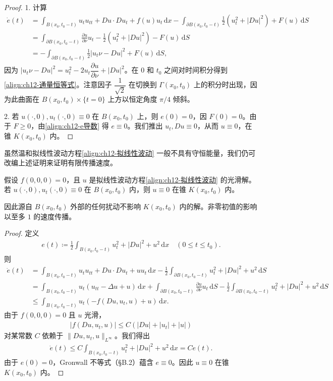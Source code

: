 \documentclass[../../main.tex]{subfiles}
\begin{document}
\begin{proof}
1. 计算
\begin{align}
\dot{e}(t)&=\int_{B(x_0,t_0-t)}u_tu_{tt}+Du\cdot Du_t+f(u)u_t\,\mathrm{d}x-\int_{\partial B(x_0,t_0-t)}\frac{1}{2}(u_t^2+|Du|^2)+F(u)\,\mathrm{d}S\nonumber\\
&=\int_{\partial B(x_0,t_0-t)}\frac{\partial u}{\partial\nu}u_t-\frac{1}{2}(u_t^2+|Du|^2)-F(u)\,\mathrm{d}S\nonumber\\
&=-\int_{\partial B(x_0,t_0-t)}\frac{1}{2}|u_t\nu-Du|^2+F(u)\,\mathrm{d}S,
\label{align:ch12-e导数}
\end{align}
因为 $|u_t\nu-Du|^2=u_t^2-2u_t\dfrac{\partial u}{\partial\nu}+|Du|^2$。在 $0$ 和 $t_0$ 之间对时间积分得到\eqref{align:ch12-通量恒等式}。注意因子 $\dfrac{1}{\sqrt{2}}$ 在切换到 $\Gamma(x_0,t_0)$ 上的积分时出现，因为此曲面在 $B(x_0,t_0)\times\{t=0\}$ 上方以恒定角度 $\pi/4$ 倾斜。

2. 若 $u(\cdot,0),u_t(\cdot,0)\equiv 0$ 在 $B(x_0,t_0)$ 上，则 $e(0)=0$，因 $F(0)=0$。由于 $F\geqslant 0$，由\eqref{align:ch12-e导数} 得 $e\equiv 0$。我们推出 $u_t,Du\equiv 0$，从而 $u\equiv 0$，在锥 $K(x_0,t_0)$ 内。
\end{proof}

虽然温和拟线性波动方程\eqref{align:ch12-拟线性波动} 一般不具有守恒能量，我们仍可改编上述证明来证明有限传播速度。

\begin{theorem}[依赖域。]\label{theorem:ch12-依赖域}假设 $f(0,0,0)=0$，且 $u$ 是拟线性波动方程\eqref{align:ch12-拟线性波动} 的光滑解。若 $u(\cdot,0),u_t(\cdot,0)\equiv 0$ 在 $B(x_0,t_0)$ 内，则 $u\equiv 0$ 在锥 $K(x_0,t_0)$ 内。

因此源自 $B(x_0,t_0)$ 外部的任何扰动不影响 $K(x_0,t_0)$ 内的解。非零初值的影响以至多 $1$ 的速度传播。
\end{theorem}

\begin{proof}
定义
\begin{align*}
e(t)\coloneqq\frac{1}{2}\int_{B(x_0,t_0-t)}u_t^2+|Du|^2+u^2\,\mathrm{d}x \quad (0\leqslant t\leqslant t_0).
\end{align*}
则
\begin{align*}
\dot{e}(t)&=\int_{B(x_0,t_0-t)}u_tu_{tt}+Du\cdot Du_t+uu_t\,\mathrm{d}x-\frac{1}{2}\int_{\partial B(x_0,t_0-t)}u_t^2+|Du|^2+u^2\,\mathrm{d}S\\
&=\int_{B(x_0,t_0-t)}u_t(u_{tt}-\Delta u+u)\,\mathrm{d}x+\int_{\partial B(x_0,t_0-t)}\frac{\partial u}{\partial\nu}u_t\,\mathrm{d}S-\frac{1}{2}\int_{\partial B(x_0,t_0-t)}u_t^2+|Du|^2+u^2\,\mathrm{d}S\\
&\leqslant\int_{B(x_0,t_0-t)}u_t(-f(Du,u_t,u)+u)\,\mathrm{d}x.
\end{align*}
由于 $f(0,0,0)=0$ 且 $u$ 光滑，
\begin{align*}
|f(Du,u_t,u)|\leqslant C(|Du|+|u_t|+|u|)
\end{align*}
对某常数 $C$ 依赖于 $\|Du,u_t,u\|_{L^\infty}$。我们得出
\begin{align*}
\dot{e}(t)\leqslant C\int_{B(x_0,t_0-t)}u_t^2+|Du|^2+u^2\,\mathrm{d}x=Ce(t).
\end{align*}
由于 $e(0)=0$，Gronwall 不等式（\S B.2）蕴含 $e\equiv 0$。因此 $u\equiv 0$ 在锥 $K(x_0,t_0)$ 内。
\end{proof}
\end{document}
